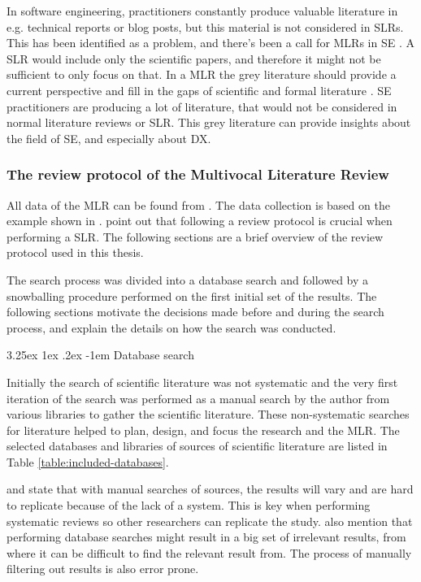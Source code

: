 \documentclass[english, 12pt, a4paper, sci, utf8, a-1b, online]{aaltothesis}
\makeatletter
\newcounter{subsubsubsection}[subsubsection]
\renewcommand\paragraph{\@startsection{paragraph}{5}{\z@}%
  {3.25ex \@plus1ex \@minus.2ex}%
  {-1em}%
  {\normalfont\normalsize\bfseries}}
\makeatother
\begin{document}
In software engineering, practitioners constantly produce valuable literature in e.g. technical reports or blog posts, but this material is not considered in SLRs. This has been identified as a problem, and there's been a call for MLRs in SE \parencite{the-need-for-MLR}. A SLR would include only the scientific papers, and therefore it might not be sufficient to only focus on that. In a MLR the grey literature should provide a current perspective and fill in the gaps of scientific and formal literature \parencite{guidelines-for-MLR}. SE practitioners are producing a lot of literature, that would not be considered in normal literature reviews or SLR. This grey literature can provide insights about the field of SE, and especially about DX.


\subsubsection{The review protocol of the Multivocal Literature Review}

All data of the MLR can be found from \textcite{nylund_2020}. The data collection is based on the example shown in \textcite{guidelines-for-MLR}. \textcite{guidelines-for-SLR-in-SE} point out that following a review protocol is crucial when performing a SLR. The following sections are a brief overview of the review protocol used in this thesis.


The search process was divided into a database search and followed by a snowballing procedure performed on the first initial set of the results. The following sections motivate the decisions made before and during the search process, and explain the details on how the search was conducted.

\paragraph{Database search}

Initially the search of scientific literature was not systematic and the very first iteration of the search was performed as a manual search by the author from various libraries to gather the scientific literature. These non-systematic searches for literature helped to plan, design, and focus the research and the MLR. The selected databases and libraries of sources of scientific literature are listed in Table \ref{table:included-databases}.

\textcite{guidelines-for-snowballing} and \textcite{guidelines-for-SLR-in-SE} state that with manual searches of sources, the results will vary and are hard to replicate because of the lack of a system. This is key when performing systematic reviews so other researchers can replicate the study. \textcite{guidelines-for-snowballing} also mention that performing database searches might result in a big set of irrelevant results, from where it can be difficult to find the relevant result from. The process of manually filtering out results is also error prone.
\end{document}
